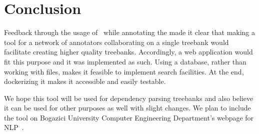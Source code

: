 \section{Conclusion}
\label{sec:conclusion}
Feedback through the usage of \boatvone\ while annotating the \bountreebank{} made it clear that making a tool for a network of annotators collaborating on a single treebank would facilitate creating higher quality treebanks.
Accordingly, a web application would fit this purpose and it was implemented as such.
Using a database, rather than working with \conllu{} files, makes it feasible to implement search facilities.
At the end, dockerizing it makes it accessible and easily testable.

We hope this tool will be used for dependency parsing treebanks and also believe it can be used for other purposes as well with slight changes.
We plan to include the tool on Bogazici University Computer Engineering Department's webpage for NLP~\cite{DIP}.

